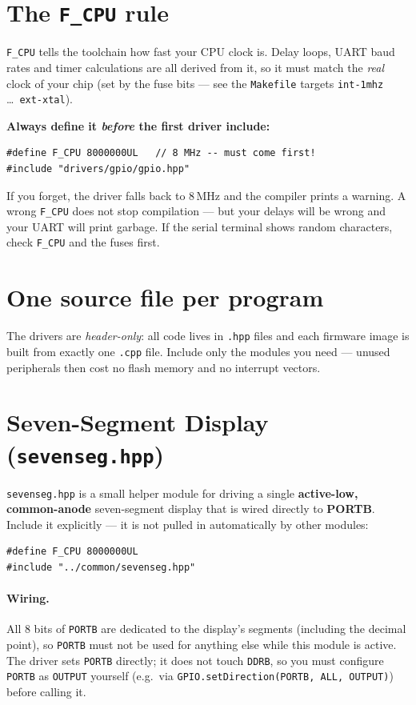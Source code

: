 \documentclass[11pt,a4paper]{article}
\begin{document}
\section{The \texttt{F\_CPU} rule}

\texttt{F\_CPU} tells the toolchain how fast your CPU clock is. Delay loops,
UART baud rates and timer calculations are all derived from it, so it must
match the \emph{real} clock of your chip (set by the fuse bits --- see the
\texttt{Makefile} targets \texttt{int-1mhz} \dots\ \texttt{ext-xtal}).

\textbf{Always define it \emph{before} the first driver include:}

\begin{lstlisting}
#define F_CPU 8000000UL   // 8 MHz -- must come first!
#include "drivers/gpio/gpio.hpp"
\end{lstlisting}

If you forget, the driver falls back to 8\,MHz and the compiler prints a
warning. A wrong \texttt{F\_CPU} does not stop compilation --- but your
delays will be wrong and your UART will print garbage. If the serial
terminal shows random characters, check \texttt{F\_CPU} and the fuses first.

\section{One source file per program}

The drivers are \emph{header-only}: all code lives in \texttt{.hpp} files and
each firmware image is built from exactly one \texttt{.cpp} file. Include
only the modules you need --- unused peripherals then cost no flash memory
and no interrupt vectors.

\section{Seven-Segment Display (\texttt{sevenseg.hpp})}

\texttt{sevenseg.hpp} is a small helper module for driving a single
\textbf{active-low, common-anode} seven-segment display that is wired
directly to \textbf{PORTB}. Include it explicitly --- it is not pulled in
automatically by other modules:

\begin{lstlisting}
#define F_CPU 8000000UL
#include "../common/sevenseg.hpp"
\end{lstlisting}

\paragraph{Wiring.} All 8 bits of \texttt{PORTB} are dedicated to the
display's segments (including the decimal point), so \texttt{PORTB} must
not be used for anything else while this module is active. The driver sets
\texttt{PORTB} directly; it does not touch \texttt{DDRB}, so you must
configure \texttt{PORTB} as \texttt{OUTPUT} yourself (e.g.\ via
\texttt{GPIO.setDirection(PORTB, ALL, OUTPUT)}) before calling it.
\end{document}
